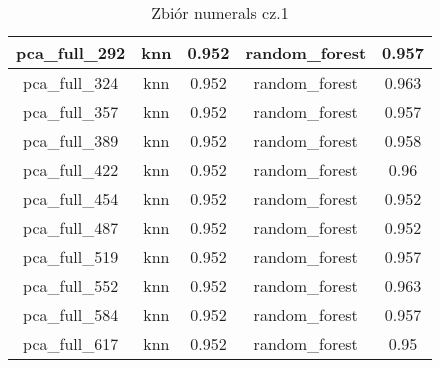 \documentclass{classrep}
\begin{document}
{{{\begin{table}[!htbp]
\begin{tabular}{|c|c|c|c|c|}
                        pca\_full\_292 & knn & 0.952 & random\_forest & 0.957 \\ \hline
                        pca\_full\_324 & knn & 0.952 & random\_forest & 0.963 \\ \hline
                        pca\_full\_357 & knn & 0.952 & random\_forest & 0.957 \\ \hline
                        pca\_full\_389 & knn & 0.952 & random\_forest & 0.958 \\ \hline
                        pca\_full\_422 & knn & 0.952 & random\_forest & 0.96 \\ \hline
                        pca\_full\_454 & knn & 0.952 & random\_forest & 0.952 \\ \hline
                        pca\_full\_487 & knn & 0.952 & random\_forest & 0.952 \\ \hline
                        pca\_full\_519 & knn & 0.952 & random\_forest & 0.957 \\ \hline
                        pca\_full\_552 & knn & 0.952 & random\_forest & 0.963 \\ \hline
                        pca\_full\_584 & knn & 0.952 & random\_forest & 0.957 \\ \hline
                        pca\_full\_617 & knn & 0.952 & random\_forest & 0.95 \\ \hline
                    \end{tabular}
                    \caption
                    {Zbiór numerals cz.1}
                    \label{table_principal_component_analysis_numerals_1}
                \end{table}
                \FloatBarrier

}}}
\end{document}
